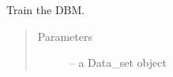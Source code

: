 \documentclass[letterpaper,10pt,english]{sphinxmanual}
\begin{document}
\begin{fulllineitems}
\begin{fulllineitems}
\end{fulllineitems}


\begin{fulllineitems}
\label{\detokenize{index:dbm_py.interface.DBM.train}}
Train the DBM.
\begin{quote}\begin{description}
\item[{Parameters}] \leavevmode
{} -- a Data\_set object

\end{description}\end{quote}

\end{fulllineitems}


\end{fulllineitems}

\end{document}
